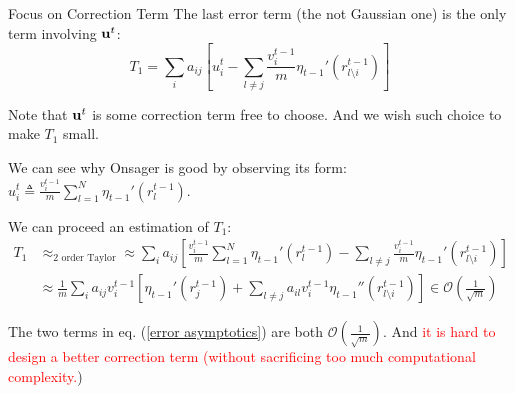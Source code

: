 \documentclass[aspectratio=43, 10pt]{beamer}
\begin{document}
\begin{frame}
    \vspace{-1mm}
    \small 
    \begin{block}{Focus on Correction Term}
        The last error term (the not Gaussian one) is the only term involving \(\bold{u}^t\):
        \begin{equation}
            T_1 = \sum_{i}a_{ij} \left[ u_i^{t} 
            -\sum_{l \neq j}\frac{v_i^{t-1}}{m}\eta_{t-1}'(r_{l\setminus i}^{t-1}) \right] 
            \label{error}
        \end{equation}

        Note that \(\bold{u}^t\) is some correction term free to choose. And we wish such choice to make $T_1$ small. 

        We can see why Onsager is good by observing its form: $u_i^t \triangleq  \frac{v_i^{t-1}}{m} \sum_{l=1}^N \eta_{t-1}'(r_l^{t-1}). $

        We can proceed an estimation of $T_1$: 
        \begin{align}
            T_1 &\approx_{\text{2 order Taylor}} \approx \sum_{i}a_{ij} \left[ \frac{v_i^{t-1}}{m} \sum_{l=1}^N \eta_{t-1}'(r_l^{t-1})  - \sum_{l \neq j}\frac{v_i^{t-1}}{m}\eta_{t-1}'(r_{l\setminus i}^{t-1})\right] \\
            & \approx \frac{1}{m}\sum_{i}a_{ij} v_i^{t-1} \left[ \eta_{t-1}'(r_j^{t-1}) +   \sum_{l\neq j} a_{il} v_i^{t-1} \eta_{t-1}''(r_{l \setminus i}^{t-1}) \right] \in \mathcal{O}(\frac{1}{\sqrt{m}})
            \label{error asymptotics}
        \end{align}  

        The two terms in eq. (\ref{error asymptotics}) are both $\mathcal{O}(\frac{1}{\sqrt{m}})$. And \textcolor{red}{it is hard to design a better correction term (without sacrificing too much computational complexity.})
    \end{block}
\end{frame}
\end{document}
